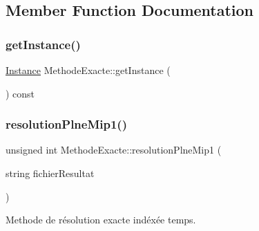 \subsection{Member Function Documentation}
\mbox{\label{classMethodeExacte_a6c8b291d40a0e9c3df51ea367d43189c}} 
\subsubsection{\texorpdfstring{get\+Instance()}{getInstance()}}
{\footnotesize\ttfamily \hyperlink{classInstance}{Instance} Methode\+Exacte\+::get\+Instance (\begin{DoxyParamCaption}{ }\end{DoxyParamCaption}) const}

\mbox{\label{classMethodeExacte_a91443b3ea749912772b40b5b5c40379e}} 
\subsubsection{\texorpdfstring{resolution\+Plne\+Mip1()}{resolutionPlneMip1()}}
{\footnotesize\ttfamily unsigned int Methode\+Exacte\+::resolution\+Plne\+Mip1 (\begin{DoxyParamCaption}\item[{string}]{fichier\+Resultat }\end{DoxyParamCaption})}



Methode de résolution exacte indéxée temps. 


